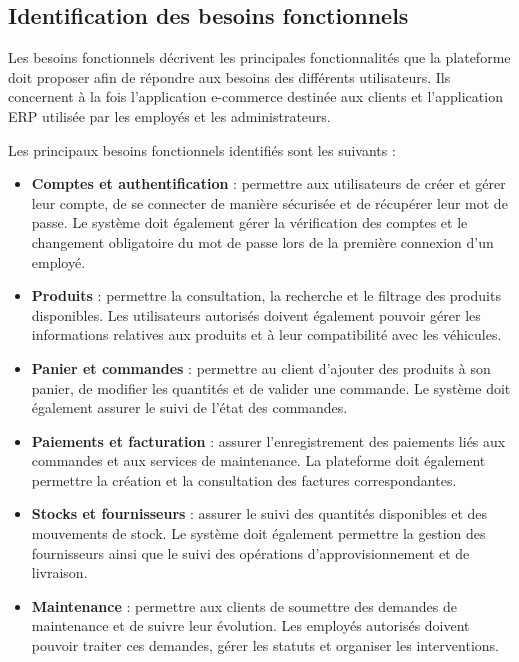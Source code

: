 \subsection{Identification des besoins fonctionnels}

Les besoins fonctionnels décrivent les principales fonctionnalités que la plateforme doit proposer afin de répondre aux besoins des différents utilisateurs. Ils concernent à la fois l'application e-commerce destinée aux clients et l'application ERP utilisée par les employés et les administrateurs.

Les principaux besoins fonctionnels identifiés sont les suivants :

\begin{itemize}

\item \textbf{Comptes et authentification} : permettre aux utilisateurs de créer et gérer leur compte, de se connecter de manière sécurisée et de récupérer leur mot de passe. Le système doit également gérer la vérification des comptes et le changement obligatoire du mot de passe lors de la première connexion d'un employé.

\item \textbf{Produits} : permettre la consultation, la recherche et le filtrage des produits disponibles. Les utilisateurs autorisés doivent également pouvoir gérer les informations relatives aux produits et à leur compatibilité avec les véhicules.

\item \textbf{Panier et commandes} : permettre au client d'ajouter des produits à son panier, de modifier les quantités et de valider une commande. Le système doit également assurer le suivi de l'état des commandes.

\item \textbf{Paiements et facturation} : assurer l'enregistrement des paiements liés aux commandes et aux services de maintenance. La plateforme doit également permettre la création et la consultation des factures correspondantes.

\item \textbf{Stocks et fournisseurs} : assurer le suivi des quantités disponibles et des mouvements de stock. Le système doit également permettre la gestion des fournisseurs ainsi que le suivi des opérations d'approvisionnement et de livraison.

\item \textbf{Maintenance} : permettre aux clients de soumettre des demandes de maintenance et de suivre leur évolution. Les employés autorisés doivent pouvoir traiter ces demandes, gérer les statuts et organiser les interventions.


\end{itemize}
